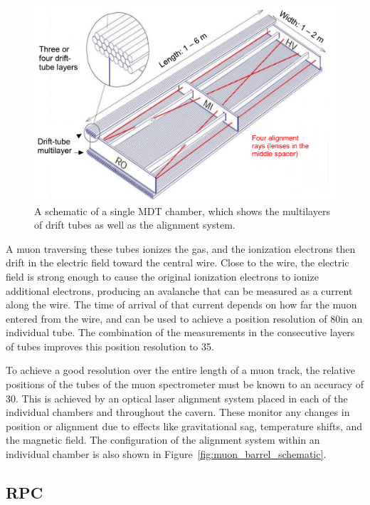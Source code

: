 \begin{figure}[hbtp]
\includegraphics[width=\fullfig]{figures/mdt_schematic.pdf}
\caption{A schematic of a single \ac{MDT} chamber, which shows the multilayers of drift tubes as well as the alignment system.}
\label{fig:mdt_schematic}
\end{figure}

A muon traversing these tubes ionizes the gas, and the ionization electrons then drift in the electric field toward the central wire.
Close to the wire, the electric field is strong enough to cause the original ionization electrons to ionize additional electrons, producing an avalanche that can be measured as a current along the wire. 
The time of arrival of that current depends on how far the muon entered from the wire, and can be used to achieve a position resolution of 80\um in an individual tube.
The combination of the measurements in the consecutive layers of tubes improves this position resolution to 35\um.

To achieve a good resolution over the entire length of a muon track, the relative positions of the tubes of the muon spectrometer must be known to an accuracy of 30\um. 
This is achieved by an optical laser alignment system placed in each of the individual chambers and throughout the cavern.
These monitor any changes in position or alignment due to effects like gravitational sag, temperature shifts, and the magnetic field.
The configuration of the alignment system within an individual chamber is also shown in Figure~\ref{fig:muon_barrel_schematic}.

\subsection{\acl{RPC}}

